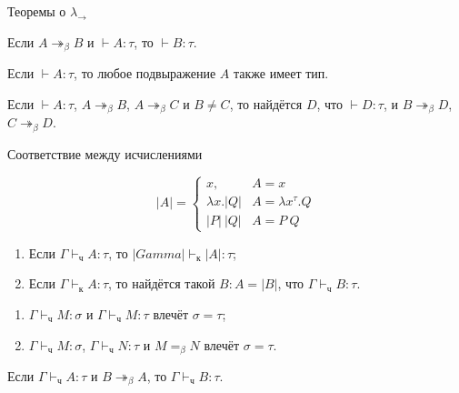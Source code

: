 \documentclass[aspectratio=169]{beamer}
\begin{document}
\begin{frame}{Теоремы о $\lambda_\rightarrow$}

\begin{lmm}
Если $A \twoheadrightarrow_\beta B$ и $\vdash A: \tau$, то $\vdash B: \tau$.
\end{lmm}

\begin{lmm}
Если $\vdash A : \tau$, то любое подвыражение $A$ также имеет тип.
\end{lmm}

\begin{thm}
Если $\vdash A:\tau$, $A \twoheadrightarrow_\beta B$, $A \twoheadrightarrow_\beta C$ и $B \ne C$, то найдётся $D$, что 
$\vdash D :\tau$, и $B \twoheadrightarrow_\beta D$, $C \twoheadrightarrow_\beta D$.
\end{thm}
\end{frame}

\begin{frame}{Соответствие между исчислениями}
\begin{dfn}
$$|A|=\left\{\begin{array}{ll}x, & A = x\\
\lambda x.|Q| & A = \lambda x^\tau.Q\\
|P|\ |Q| & A = P\ Q
\end{array}\right.$$
\end{dfn}\vspace{-0.5cm}

\begin{thm}\begin{enumerate}
\item Если $\Gamma \vdash_\text{ч} A : \tau$, то $|Gamma| \vdash_\text{к} |A| : \tau$;
\item Если $\Gamma \vdash_\text{к} A : \tau$, то найдётся такой $B: A = |B|$, что $\Gamma \vdash_\text{ч} B : \tau$.
\end{enumerate}
\end{thm}

\begin{thm}
\begin{enumerate}
\item $\Gamma \vdash_\text{ч} M : \sigma$ и $\Gamma \vdash_\text{ч} M: \tau$ влечёт $\sigma = \tau$;
\item $\Gamma \vdash_\text{ч} M : \sigma$, $\Gamma \vdash_\text{ч} N : \tau$ и $M =_\beta N$ влечёт $\sigma = \tau$.
\end{enumerate}
\end{thm}

\begin{lmm}
Если $\Gamma \vdash_\text{ч} A : \tau$ и $B \twoheadrightarrow_\beta A$, то $\Gamma \vdash_\text{ч} B : \tau$.
\end{lmm}
\end{frame}
\end{document}
